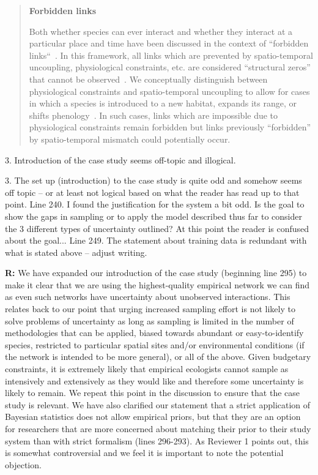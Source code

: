 \documentclass[12pt]{letter}
\newenvironment{refquote}{\bigskip \begin{it}}{\end{it}\smallskip}
\begin{document}
			\begin{quotation}
        \textbf{Forbidden links}

            Both whether species can ever interact and whether they interact at a particular place and time have been discussed in the context of ``forbidden links``~\citep{Jordano2016}. In this framework, all links which are prevented by spatio-temporal uncoupling, physiological constraints, etc. are considered ``structural zeros'' that cannot be observed~\citep{Jordano1987,Jordano2016}. We conceptually distinguish between physiological constraints and spatio-temporal uncoupling to allow for cases in which a species is introduced to a new habitat, expands its range, or shifts phenology~\citep{Gravel2013}. In such cases, links which are impossible due to physiological constraints remain forbidden but links previously ``forbidden'' by spatio-temporal mismatch could potentially occur. 
      \end{quotation}


	3. Introduction of the case study seems off-topic and illogical. 


		\begin{refquote}
		3.      The set up (introduction) to the case study is quite odd and somehow seems off topic – or at least not logical based on what the reader has read up to that point.
		\medskip
		Line 240.  I found the justification for the system a bit odd.  Is the goal to show the gaps in sampling or to apply the model described thus far to consider the 3 different types of uncertainty outlined?  At this point the reader is confused about the goal...
		\medskip
		Line 249.  The statement about training data is redundant with what is stated above – adjust writing.
		\end{refquote}


		\textbf{R:} We have expanded our introduction of the case study (beginning line 295) to make it clear that we are using the highest-quality empirical network we can find as even such networks have uncertainty about unobserved interactions. This relates back to our point that urging increased sampling effort is not likely to solve problems of uncertainty as long as sampling is limited in the number of methodologies that can be applied, biased towards abundant or easy-to-identify species, restricted to particular spatial sites and/or environmental conditions (if the network is intended to be more general), or all of the above. Given budgetary constraints, it is extremely likely that empirical ecologists cannot sample as intensively and extensively as they would like and therefore some uncertainty is likely to remain. We repeat this point in the discussion to ensure that the case study is relevant. We have also clarified our statement that a strict application of Bayesian statistics does not allow empirical priors, but that they are an option for researchers that are more concerned about matching their prior to their study system than with strict formalism (lines 296-293). As Reviewer 1 points out, this is somewhat controversial and we feel it is important to note the potential objection.
\end{document}
